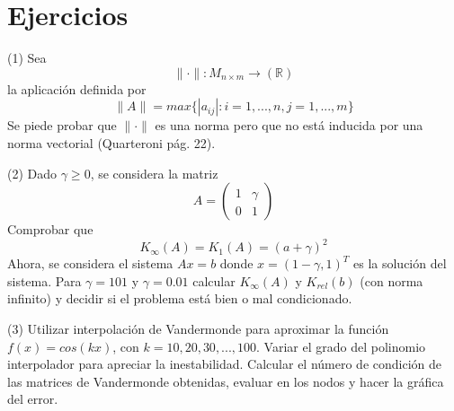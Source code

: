 \section*{Ejercicios}
\noindent (1) Sea
\[ \| \cdot \|: M_{n \times m} \rightarrow (\mathbb{R}) \]
la aplicación definida por
\[ \|A\| = max\{ |a_{ij}|: i = 1,..., n, j = 1,..., m \} \]
Se piede probar que $\| \cdot \|$ es una norma pero que no está inducida por una norma vectorial (Quarteroni pág. 22).

\noindent (2) Dado $\gamma \geq 0$, se considera la matriz
\[ A = \begin{pmatrix}
    1 & \gamma \\
    0 &    1
\end{pmatrix} \]
Comprobar que
\[ K_\infty (A) = K_1 (A) = (a + \gamma )^2 \]
Ahora, se considera el sistema $Ax = b$ donde $x = (1 - \gamma, 1)^T$ es la solución del sistema. Para $\gamma = 101$ y $\gamma = 0.01$ calcular $K_\infty (A)$ y $K_{rel}(b)$ (con norma infinito) y decidir si el problema está bien o mal condicionado.

\noindent (3) Utilizar interpolación de Vandermonde para aproximar la función $f(x) = cos(kx)$, con $k = 10, 20, 30,..., 100$. Variar el grado del polinomio interpolador para apreciar la inestabilidad. Calcular el número de condición de las matrices de Vandermonde obtenidas, evaluar en los nodos y hacer la gráfica del error.